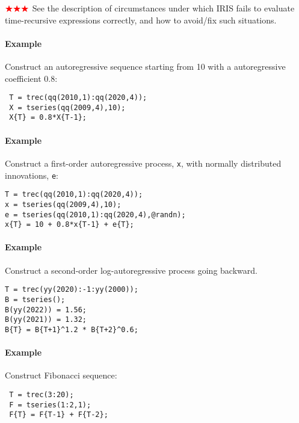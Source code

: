 ${\color{red}\bigstar\bigstar\bigstar}$ See the description of circumstances under which IRIS fails
to evaluate time-recursive expressions correctly, and how to avoid/fix
such situations.

\paragraph{Example}\label{example}

Construct an autoregressive sequence starting from 10 with a
autoregressive coefficient 0.8:

\begin{verbatim}
 T = trec(qq(2010,1):qq(2020,4));
 X = tseries(qq(2009,4),10);
 X{T} = 0.8*X{T-1};
\end{verbatim}

\paragraph{Example}\label{example-1}

Construct a first-order autoregressive process, \texttt{x}, with
normally distributed innovations, \texttt{e}:

\begin{verbatim}
T = trec(qq(2010,1):qq(2020,4));
x = tseries(qq(2009,4),10);
e = tseries(qq(2010,1):qq(2020,4),@randn);
x{T} = 10 + 0.8*x{T-1} + e{T};
\end{verbatim}

\paragraph{Example}\label{example-2}

Construct a second-order log-autoregressive process going backward.

\begin{verbatim}
T = trec(yy(2020):-1:yy(2000));
B = tseries();
B(yy(2022)) = 1.56;
B(yy(2021)) = 1.32;
B{T} = B{T+1}^1.2 * B{T+2}^0.6;
\end{verbatim}

\paragraph{Example}\label{example-3}

Construct Fibonacci sequence:

\begin{verbatim}
 T = trec(3:20);
 F = tseries(1:2,1);
 F{T} = F{T-1} + F{T-2};
\end{verbatim}

